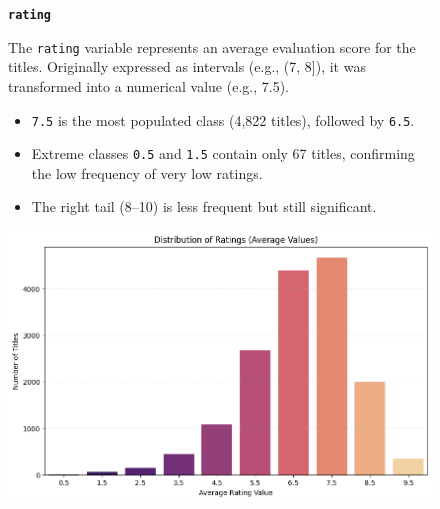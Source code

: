 \documentclass[10pt]{article}
\begin{document}
\begin{figure}[H]
    \begin{minipage}{0.60\textwidth}
        \textbf{\texttt{rating}}\par
        The \texttt{rating} variable represents an average evaluation score for the titles.
        Originally expressed as intervals (e.g., (7, 8]), it was transformed into a numerical value (e.g., 7.5).\par

        \begin{itemize}
            \item \texttt{7.5} is the most populated class (4,822 titles), followed by \texttt{6.5}.
            \item Extreme classes \texttt{0.5} and \texttt{1.5} contain only 67 titles, confirming the low frequency of very low ratings.
            \item The right tail (8–10) is less frequent but still significant.
        \end{itemize}
    \end{minipage}
    \hfill
\begin{minipage}{0.39\textwidth}
    \centering
    \includegraphics[width=0.9\linewidth]{rating_dist_prep.png}
    \vspace{3pt}
    \label{fig:rating-dist}
\end{minipage}
\end{figure}
\end{document}
